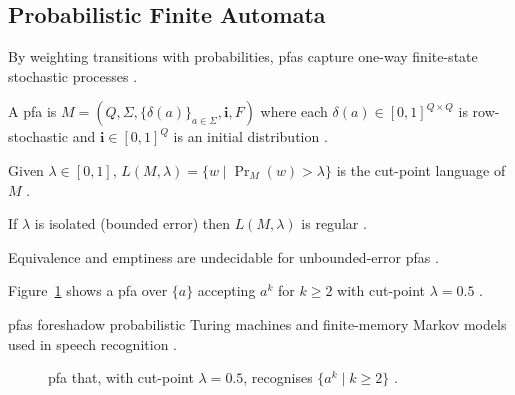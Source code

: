 \subsection{Probabilistic Finite Automata}\label{subsec:pfa}

By weighting transitions with probabilities, \glspl{pfa} capture
one-way finite-state stochastic processes
\cite{Rabin1963}.

\begin{definition}\label{def:pfa}
A \gls{pfa} is
$M=(Q,\Sigma,\{\delta(a)\}_{a\in\Sigma},\mathbf{i},F)$
where each
$\delta(a)\in[0,1]^{Q\times Q}$ is row-stochastic and
$\mathbf{i}\in[0,1]^{Q}$ is an initial distribution
\cite{Rabin1963}.
\end{definition}

\begin{concept}\label{concept:cutpoint}
Given $\lambda\in[0,1]$,
$L(M,\lambda)=\{w\mid \Pr_{M}(w)>\lambda\}$ is the cut-point language
of $M$ \cite{Rabin1963}.
\end{concept}

\begin{theorem}\label{thm:pfa-bounded}
If \(\lambda\) is isolated (bounded error) then
\(L(M,\lambda)\) is regular \cite{Paz1971}.
\end{theorem}

\begin{proposition}[Undecidability]\label{prop:pfa-undec}
Equivalence and emptiness are undecidable for unbounded-error
\glspl{pfa} \cite{Paz1971}.
\end{proposition}

\begin{example}\label{ex:pfa-unary}
Figure~\ref{fig:pfa-figure} shows a \gls{pfa} over $\{a\}$ accepting
$a^{k}$ for $k\ge2$ with cut-point $\lambda=0.5$
\cite{Rabin1963}.
\end{example}

\begin{observation}\label{obs:pfa-history}
\glspl{pfa} foreshadow probabilistic Turing machines and
finite-memory Markov models used in speech recognition
\cite{Rabin1963,Paz1971}.
\end{observation}

\begin{figure}[H]
    \centering
    \caption{\gls{pfa} that, with cut-point $\lambda=0.5$, recognises
    $\{a^{k}\mid k\ge 2\}$ \cite{Rabin1963}.}
    \label{fig:pfa-figure}
\end{figure}

